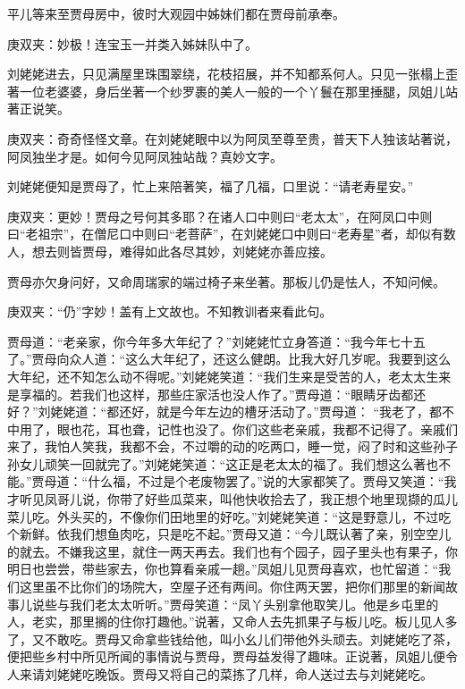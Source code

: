 \begin{parag}
    平儿等来至贾母房中，彼时大观园中姊妹们都在贾母前承奉。\begin{note}庚双夹：妙极！连宝玉一并类入姊妹队中了。\end{note}刘姥姥进去，只见满屋里珠围翠绕，花枝招展，并不知都系何人。只见一张榻上歪著一位老婆婆，身后坐著一个纱罗裹的美人一般的一个丫鬟在那里捶腿，凤姐儿站著正说笑。\begin{note}庚双夹：奇奇怪怪文章。在刘姥姥眼中以为阿凤至尊至贵，普天下人独该站著说，阿凤独坐才是。如何今见阿凤独站哉？真妙文字。\end{note}刘姥姥便知是贾母了，忙上来陪著笑，福了几福，口里说：“请老寿星安。”\begin{note}庚双夹：更妙！贾母之号何其多耶？在诸人口中则曰“老太太”，在阿凤口中则曰“老祖宗”，在僧尼口中则曰“老菩萨”，在刘姥姥口中则曰“老寿星”者，却似有数人，想去则皆贾母，难得如此各尽其妙，刘姥姥亦善应接。\end{note}贾母亦欠身问好，又命周瑞家的端过椅子来坐著。那板儿仍是怯人，不知问候。\begin{note}庚双夹：“仍”字妙！盖有上文故也。不知教训者来看此句。\end{note}贾母道：“老亲家，你今年多大年纪了？”刘姥姥忙立身答道：“我今年七十五了。”贾母向众人道：“这么大年纪了，还这么健朗。比我大好几岁呢。我要到这么大年纪，还不知怎么动不得呢。”刘姥姥笑道：“我们生来是受苦的人，老太太生来是享福的。若我们也这样，那些庄家活也没人作了。”贾母道：“眼睛牙齿都还好？”刘姥姥道：“都还好，就是今年左边的槽牙活动了。”贾母道： “我老了，都不中用了，眼也花，耳也聋，记性也没了。你们这些老亲戚，我都不记得了。亲戚们来了，我怕人笑我，我都不会，不过嚼的动的吃两口，睡一觉，闷了时和这些孙子孙女儿顽笑一回就完了。”刘姥姥笑道：“这正是老太太的福了。我们想这么著也不能。”贾母道：“什么福，不过是个老废物罢了。”说的大家都笑了。贾母又笑道：“我才听见凤哥儿说，你带了好些瓜菜来，叫他快收拾去了，我正想个地里现撷的瓜儿菜儿吃。外头买的，不像你们田地里的好吃。”刘姥姥笑道：“这是野意儿，不过吃个新鲜。依我们想鱼肉吃，只是吃不起。”贾母又道：“今儿既认著了亲，别空空儿的就去。不嫌我这里，就住一两天再去。我们也有个园子，园子里头也有果子，你明日也尝尝，带些家去，你也算看亲戚一趟。”凤姐儿见贾母喜欢，也忙留道：“我们这里虽不比你们的场院大，空屋子还有两间。你住两天罢，把你们那里的新闻故事儿说些与我们老太太听听。”贾母笑道：“凤丫头别拿他取笑儿。他是乡屯里的人，老实，那里搁的住你打趣他。”说著，又命人去先抓果子与板儿吃。板儿见人多了，又不敢吃。贾母又命拿些钱给他，叫小幺儿们带他外头顽去。刘姥姥吃了茶，便把些乡村中所见所闻的事情说与贾母，贾母益发得了趣味。正说著，凤姐儿便令人来请刘姥姥吃晚饭。贾母又将自己的菜拣了几样，命人送过去与刘姥姥吃。
\end{parag}


